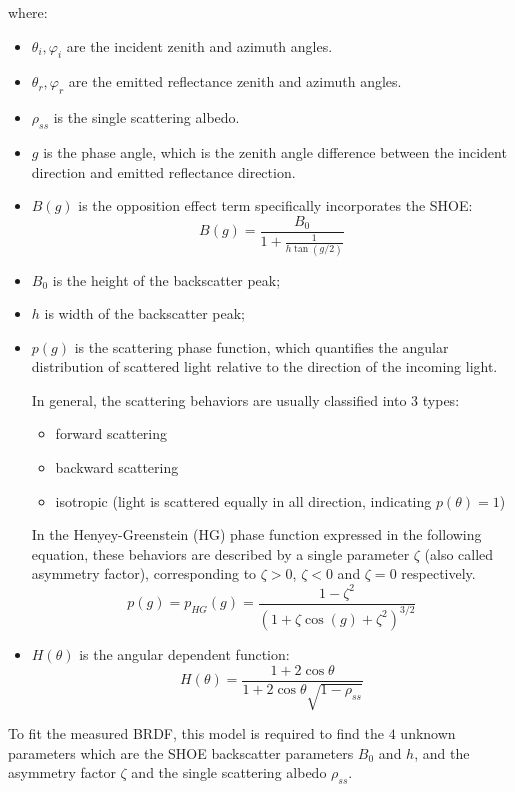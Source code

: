 where:
\begin{itemize}
    \item $\theta_i, \varphi_i$ are the incident zenith and azimuth angles.
    \item $\theta_r, \varphi_r$ are the emitted reflectance zenith and azimuth angles.
    \item $\rho_{ss}$ is the single scattering albedo.
    \item $g$ is the phase angle, which is the zenith angle difference between the incident direction and emitted reflectance direction.
    \item $B(g)$ is the opposition effect term specifically incorporates the SHOE:
          \[
              B(g) = \frac{B_0}{1 + \frac{1}{h \tan(g/2)}}
          \]
    \item $B_0$ is the height of the backscatter peak;
    \item $h$ is width of the backscatter peak;
    \item $p(g)$ is the scattering phase function, which quantifies the angular distribution of scattered light relative to the direction of the incoming light.

          In general, the scattering behaviors are usually classified into 3 types:
          \begin{itemize}
              \item forward scattering
              \item backward  scattering
              \item isotropic (light is scattered equally in all direction, indicating $p(\theta) = 1$)
          \end{itemize}
          In the Henyey-Greenstein (HG) phase function expressed in the following equation, these behaviors are described by a single parameter $\zeta$ (also called asymmetry factor), corresponding to $\zeta > 0$, $\zeta < 0$ and $\zeta = 0$ respectively.
          \[
              p(g) = p_{HG}(g) =\frac{1 - \zeta^2}{\left(1 + \zeta \cos(g) + \zeta^2\right)^{3/2}}
          \]

    \item $H(\theta)$ is the angular dependent function:
          \[
              H(\theta) = \frac{1 + 2\cos\theta}{1 + 2\cos\theta \sqrt{1 - \rho_{ss}} }
          \]
\end{itemize}
To fit the measured BRDF, this model is required to find the $4$ unknown parameters which are the SHOE backscatter parameters $B_0$ and $h$, and  the asymmetry factor $\zeta$ and the single scattering albedo $\rho_{ss}$.
